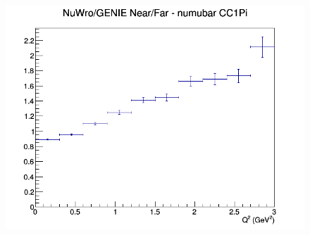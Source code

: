 \documentclass[12pt]{article}
\begin{document}
\begin{figure}[h]
\endminipage
{}
\includegraphics[width=\linewidth]{eff_Q2/GAr/ratios/CC1Pi_NuWro_GENIE_numubar_NF_Q2.png}
\endminipage
\newline
\end{figure}
\clearpage
\end{document}
